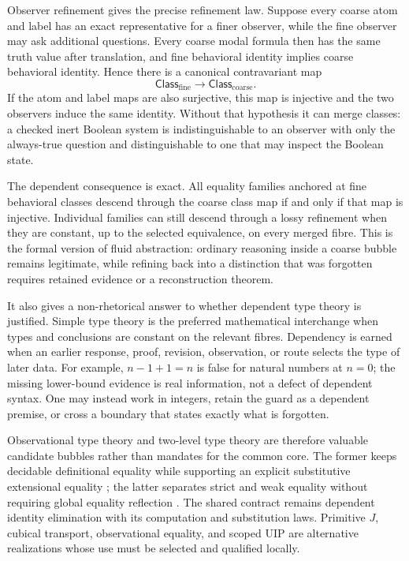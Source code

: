 \documentclass[11pt]{article}
\theoremstyle{definition}
\theoremstyle{remark}
\begin{document}
Observer refinement gives the precise refinement law.  Suppose every coarse atom and
label has an exact representative for a finer observer, while the fine observer
may ask additional questions.  Every coarse modal formula then has the same
truth value after translation, and fine behavioral identity implies coarse
behavioral identity.  Hence there is a canonical contravariant map
\[
  \mathsf{Class}_{\mathrm{fine}}
    \longrightarrow \mathsf{Class}_{\mathrm{coarse}}.
\]
If the atom and label maps are also surjective, this map is injective and the
two observers induce the same identity.  Without that hypothesis it can merge
classes: a checked inert Boolean system is indistinguishable to an observer
with only the always-true question and distinguishable to one that may inspect
the Boolean state.

The dependent consequence is exact.  All equality families anchored at fine
behavioral classes descend through the coarse class map if and only if that map
is injective.  Individual families can still descend through a lossy refinement when
they are constant, up to the selected equivalence, on every merged fibre.  This
is the formal version of fluid abstraction: ordinary reasoning inside a coarse
bubble remains legitimate, while refining back into a distinction that was
forgotten requires retained evidence or a reconstruction theorem.

It also gives a non-rhetorical answer to whether dependent type theory is
justified.  Simple type theory is the preferred mathematical interchange when
types and conclusions are constant on the relevant fibres.  Dependency is
earned when an earlier response, proof, revision, observation, or route selects
the type of later data.  For example, $n-1+1=n$ is false for natural numbers at
$n=0$; the missing lower-bound evidence is real information, not a defect of
dependent syntax.  One may instead work in integers, retain the guard as a
dependent premise, or cross a boundary that states exactly what is forgotten.

Observational type theory and two-level type theory are therefore valuable
candidate bubbles rather than mandates for the common core.  The former keeps
decidable definitional equality while supporting an explicit substitutive
extensional equality \cite{AltenkirchMcBrideOTT}; the latter separates strict
and weak equality without requiring global equality reflection
\cite{AltenkirchCapriottiKraus2LTT}.  The shared contract remains dependent
identity elimination with its computation and substitution laws.  Primitive
$J$, cubical transport, observational equality, and scoped UIP are alternative
realizations whose use must be selected and qualified locally.
\end{document}
